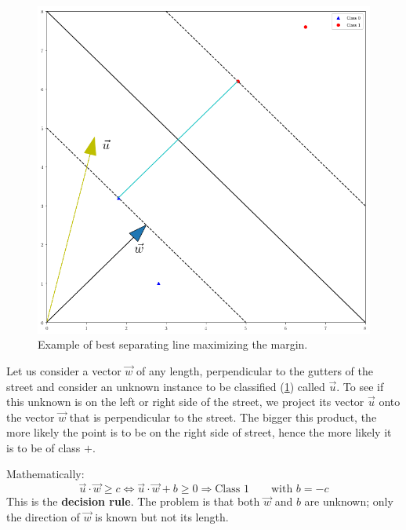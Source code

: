 \documentclass[12pt, letterpaper]{article}
\theoremstyle{definition}
\let\tb\textbf
\begin{document}
\begin{figure}
\centering
\includegraphics[scale=0.4]{img/separableClassesPy}
\caption{Example of best separating line maximizing the margin.}
\label{separableClassesPy}
\end{figure}

Let us consider a vector $\vec{w}$ of any length, perpendicular to the gutters of the street and consider an unknown instance to be classified (\ref{separableClassesPy}) called $\vec{u}$. To see if this unknown is on the left or right side of the street, we project its vector $\vec{u}$ onto the vector $\vec{w}$ that is perpendicular to the street. The bigger this product, the more likely the point is to be on the right side of street, hence the more likely it is to be of class $+$.

Mathematically:
\begin{equation}
\vec{u}\cdot \vec{w} \ge c \Leftrightarrow \vec{u}\cdot \vec{w} + b \ge0\Rightarrow \text{Class } 1 \quad\quad \text{with } b=-c
\end{equation}
This is the \tb{decision rule}. The problem is that both $\vec{w}$ and $b$ are unknown; only the direction of $\vec{w}$ is known but not its length.
\end{document}
